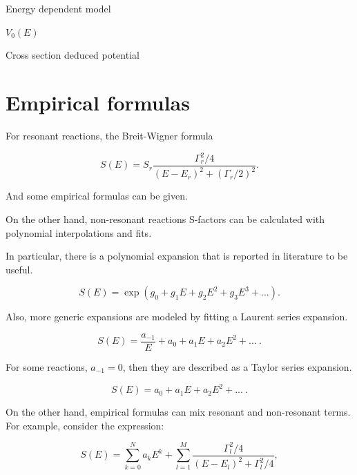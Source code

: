 \documentclass[openany]{book}
\begin{document}
Energy dependent model \cite{singh_sukhvinder_kharab_2013B}

$V_0(E)$

Cross section deduced potential \cite{bass_1977} \cite{nandi_swami_gupta_kumar_chakraborty_manjunatha_2022}




\section{Empirical formulas} \label{sec:empiricalFormulas}


For resonant reactions, the Breit-Wigner formula

\begin{equation} \label{eq:empirical_breitWigner}
	S(E) = S_r \frac{\Gamma^2_r/4}{(E-E_r)^2 + (\Gamma_r/2)^2}.
\end{equation}

And some empirical formulas can be given. 

On the other hand, non-resonant reactions S-factors can be calculated with polynomial interpolations and fits. 

In particular, there is a polynomial expansion that is reported in literature to be useful. 


\begin{equation} \label{eq:empirical_exponential}
	S(E) = \exp{(g_0 + g_1E + g_2E^2 + g_3E^3 + ...)}.
\end{equation}

Also, more generic expansions are modeled by fitting a Laurent series expansion. 

\begin{equation}  \label{eq:empirical_laurent}
	S(E) =\frac{ a_{-1}}{E} + a_0 + a_1 E + a_2 E^2 + ... \ .
\end{equation}

For some reactions, $a_{-1} = 0$, then they are described as a Taylor series expansion.

\begin{equation}  \label{eq:empirical_polynomial}
	S(E) = a_0 + a_1E + a_2 E^2 + ... \ .
\end{equation}


On the other hand, empirical formulas can mix resonant and non-resonant terms. For example, consider the expression: 

\begin{equation}  \label{eq:empirical_hybridPolynomial}
	S(E) =  \sum _{k = 0}^{N} {a_kE^k} + \sum_{l = 1}^{M} {\frac{\Gamma_l^2/4}{(E - E_l)^2 + \Gamma_l^2/4}},
\end{equation}
\end{document}
